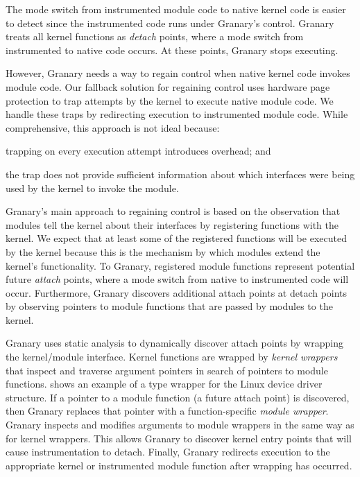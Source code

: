 \documentclass[preprint]{sigplanconf}
\begin{document}
The mode switch from instrumented module code to native kernel code is easier to detect since the instrumented code runs under Granary's control. Granary treats all kernel functions as \emph{detach} points, where a mode switch from instrumented to native code occurs. At these points, Granary stops executing.

However, Granary needs a way to regain control when native kernel code invokes module code. Our fallback solution for regaining control uses hardware page protection to trap attempts by the kernel to execute native module code. We handle these traps by redirecting execution to instrumented module code. While comprehensive, this approach is not ideal because: \begin{inparaenum}[i)]
	\item trapping on every execution attempt introduces overhead; and
	\item the trap does not provide sufficient information about which interfaces were being used by the kernel to invoke the module.
\end{inparaenum}

Granary's main approach to regaining control is based on the observation that modules tell the kernel about their interfaces by registering functions with the kernel. We expect that at least some of the registered functions will be executed by the kernel because this is the mechanism by which modules extend the kernel's functionality. To Granary, registered module functions represent potential future \emph{attach} points, where a mode switch from native to instrumented code will occur. Furthermore, Granary discovers additional attach points at detach points by observing pointers to module functions that are passed by modules to the kernel.

Granary uses static analysis to dynamically discover attach points by wrapping the kernel/module interface. Kernel functions are wrapped by \emph{kernel wrappers} that inspect and traverse argument pointers in search of pointers to module functions.  shows an example of a type wrapper for the Linux device driver structure. If a pointer to a module function (a future attach point) is discovered, then Granary replaces that pointer with a function-specific \emph{module wrapper}. Granary inspects and modifies arguments to module wrappers in the same way as for kernel wrappers. This allows Granary to discover kernel entry points that will cause instrumentation to detach. Finally, Granary redirects execution to the appropriate kernel or instrumented module function after wrapping has occurred.
\end{document}

